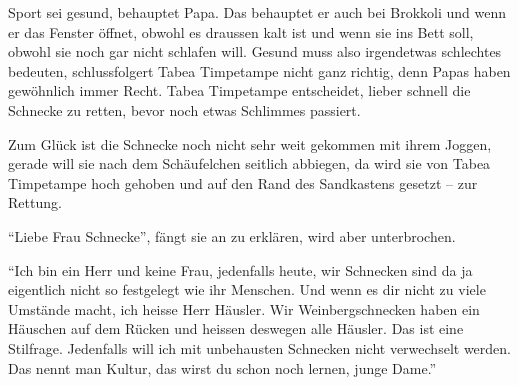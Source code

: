 Sport sei gesund, behauptet Papa. Das behauptet er auch bei Brokkoli und wenn er das Fenster öffnet, obwohl es draussen kalt ist und wenn sie ins Bett soll, obwohl sie noch gar nicht schlafen will. Gesund muss also irgendetwas schlechtes bedeuten, schlussfolgert Tabea Timpetampe nicht ganz richtig, denn Papas haben gewöhnlich immer Recht. Tabea Timpetampe entscheidet, lieber schnell die Schnecke zu retten, bevor noch etwas Schlimmes passiert.

Zum Glück ist die Schnecke noch nicht sehr weit gekommen mit ihrem Joggen, gerade will sie nach dem Schäufelchen seitlich abbiegen, da wird sie von Tabea Timpetampe hoch gehoben und auf den Rand des Sandkastens gesetzt -- zur Rettung. 

\enquote{Liebe Frau Schnecke}, fängt sie an zu erklären, wird aber unterbrochen.

\enquote{Ich bin ein Herr und keine Frau, jedenfalls heute, wir Schnecken sind da ja eigentlich nicht so festgelegt wie ihr Menschen. Und wenn es dir nicht zu viele Umstände macht, ich heisse Herr Häusler. Wir Weinbergschnecken haben ein Häuschen auf dem Rücken und heissen deswegen alle Häusler. Das ist eine Stilfrage. Jedenfalls will ich mit unbehausten Schnecken nicht verwechselt werden. Das nennt man Kultur, das wirst du schon noch lernen, junge Dame.}


